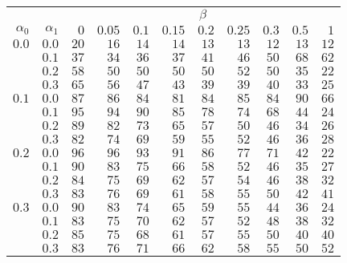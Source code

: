 \begin{tabular}{rr|rrrrrrrrr}
\hline\hline
 && \multicolumn{9}{c}{$\beta$}\\
 $\alpha_0$ & $\alpha_1$ & $0$ & $0.05$ & $0.1$ & $0.15$ & $0.2$ & $0.25$ & $0.3$ & $0.5$ & $1$ \\ 
 \hline
$0.0$ & $0.0$ & $20$ & $16$ & $14$ & $14$ & $13$ & $13$ & $12$ & $13$ & $12$\\ 
 & $0.1$ & $37$ & $34$ & $36$ & $37$ & $41$ & $46$ & $50$ & $68$ & $62$\\ 
 & $0.2$ & $58$ & $50$ & $50$ & $50$ & $50$ & $52$ & $50$ & $35$ & $22$\\ 
 & $0.3$ & $65$ & $56$ & $47$ & $43$ & $39$ & $39$ & $40$ & $33$ & $25$\\ 
\hline 
 $0.1$ & $0.0$ & $87$ & $86$ & $84$ & $81$ & $84$ & $85$ & $84$ & $90$ & $66$\\ 
 & $0.1$ & $95$ & $94$ & $90$ & $85$ & $78$ & $74$ & $68$ & $44$ & $24$\\ 
 & $0.2$ & $89$ & $82$ & $73$ & $65$ & $57$ & $50$ & $46$ & $34$ & $26$\\ 
 & $0.3$ & $82$ & $74$ & $69$ & $59$ & $55$ & $52$ & $46$ & $36$ & $28$\\ 
\hline 
 $0.2$ & $0.0$ & $96$ & $96$ & $93$ & $91$ & $86$ & $77$ & $71$ & $42$ & $22$\\ 
 & $0.1$ & $90$ & $83$ & $75$ & $66$ & $58$ & $52$ & $46$ & $35$ & $27$\\ 
 & $0.2$ & $84$ & $75$ & $69$ & $62$ & $57$ & $54$ & $46$ & $38$ & $32$\\ 
 & $0.3$ & $83$ & $76$ & $69$ & $61$ & $58$ & $55$ & $50$ & $42$ & $41$\\ 
\hline 
 $0.3$ & $0.0$ & $90$ & $83$ & $74$ & $65$ & $59$ & $55$ & $44$ & $36$ & $24$\\ 
 & $0.1$ & $83$ & $75$ & $70$ & $62$ & $57$ & $52$ & $48$ & $38$ & $32$\\ 
 & $0.2$ & $85$ & $75$ & $68$ & $61$ & $57$ & $55$ & $50$ & $40$ & $40$\\ 
 & $0.3$ & $83$ & $76$ & $71$ & $66$ & $62$ & $58$ & $55$ & $50$ & $52$\\ 
 \hline 
 \end{tabular}
